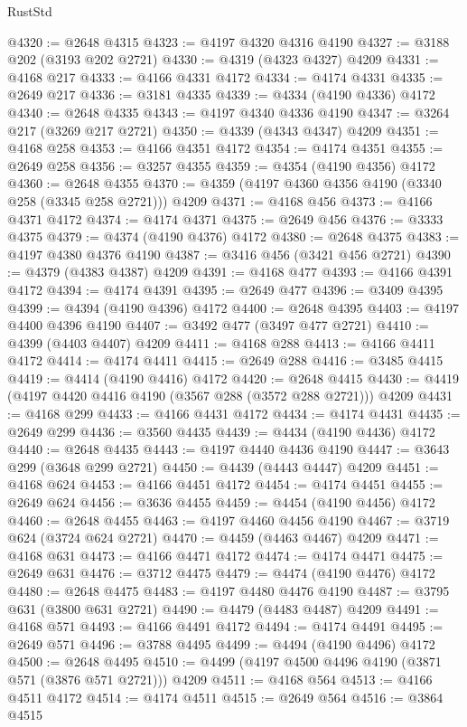 \begin{lexlean}{RustStd}
\begin{coremodule}
@4320 := @2648 @4315
@4323 := @4197 @4320 @4316 @4190
@4327 := @3188 @202 (@3193 @202 @2721)
@4330 := @4319 (@4323 @4327) @4209
@4331 := @4168 @217
@4333 := @4166 @4331 @4172
@4334 := @4174 @4331
@4335 := @2649 @217
@4336 := @3181 @4335
@4339 := @4334 (@4190 @4336) @4172
@4340 := @2648 @4335
@4343 := @4197 @4340 @4336 @4190
@4347 := @3264 @217 (@3269 @217 @2721)
@4350 := @4339 (@4343 @4347) @4209
@4351 := @4168 @258
@4353 := @4166 @4351 @4172
@4354 := @4174 @4351
@4355 := @2649 @258
@4356 := @3257 @4355
@4359 := @4354 (@4190 @4356) @4172
@4360 := @2648 @4355
@4370 := @4359 (@4197 @4360 @4356 @4190 (@3340 @258 (@3345 @258 @2721))) @4209
@4371 := @4168 @456
@4373 := @4166 @4371 @4172
@4374 := @4174 @4371
@4375 := @2649 @456
@4376 := @3333 @4375
@4379 := @4374 (@4190 @4376) @4172
@4380 := @2648 @4375
@4383 := @4197 @4380 @4376 @4190
@4387 := @3416 @456 (@3421 @456 @2721)
@4390 := @4379 (@4383 @4387) @4209
@4391 := @4168 @477
@4393 := @4166 @4391 @4172
@4394 := @4174 @4391
@4395 := @2649 @477
@4396 := @3409 @4395
@4399 := @4394 (@4190 @4396) @4172
@4400 := @2648 @4395
@4403 := @4197 @4400 @4396 @4190
@4407 := @3492 @477 (@3497 @477 @2721)
@4410 := @4399 (@4403 @4407) @4209
@4411 := @4168 @288
@4413 := @4166 @4411 @4172
@4414 := @4174 @4411
@4415 := @2649 @288
@4416 := @3485 @4415
@4419 := @4414 (@4190 @4416) @4172
@4420 := @2648 @4415
@4430 := @4419 (@4197 @4420 @4416 @4190 (@3567 @288 (@3572 @288 @2721))) @4209
@4431 := @4168 @299
@4433 := @4166 @4431 @4172
@4434 := @4174 @4431
@4435 := @2649 @299
@4436 := @3560 @4435
@4439 := @4434 (@4190 @4436) @4172
@4440 := @2648 @4435
@4443 := @4197 @4440 @4436 @4190
@4447 := @3643 @299 (@3648 @299 @2721)
@4450 := @4439 (@4443 @4447) @4209
@4451 := @4168 @624
@4453 := @4166 @4451 @4172
@4454 := @4174 @4451
@4455 := @2649 @624
@4456 := @3636 @4455
@4459 := @4454 (@4190 @4456) @4172
@4460 := @2648 @4455
@4463 := @4197 @4460 @4456 @4190
@4467 := @3719 @624 (@3724 @624 @2721)
@4470 := @4459 (@4463 @4467) @4209
@4471 := @4168 @631
@4473 := @4166 @4471 @4172
@4474 := @4174 @4471
@4475 := @2649 @631
@4476 := @3712 @4475
@4479 := @4474 (@4190 @4476) @4172
@4480 := @2648 @4475
@4483 := @4197 @4480 @4476 @4190
@4487 := @3795 @631 (@3800 @631 @2721)
@4490 := @4479 (@4483 @4487) @4209
@4491 := @4168 @571
@4493 := @4166 @4491 @4172
@4494 := @4174 @4491
@4495 := @2649 @571
@4496 := @3788 @4495
@4499 := @4494 (@4190 @4496) @4172
@4500 := @2648 @4495
@4510 := @4499 (@4197 @4500 @4496 @4190 (@3871 @571 (@3876 @571 @2721))) @4209
@4511 := @4168 @564
@4513 := @4166 @4511 @4172
@4514 := @4174 @4511
@4515 := @2649 @564
@4516 := @3864 @4515

\end{coremodule}
\end{lexlean}
